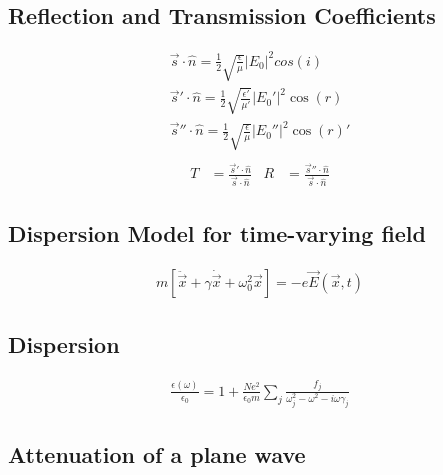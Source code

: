 \documentclass[a4paper, 11pt, landscape]{article}
\begin{document}
\begin{multicols*}{3}
\subsection{Reflection and Transmission Coefficients}
\begin{compactenum}
	\begin{align*}
        \vec{s} \cdot \hat{n} = \frac{1}{2}\sqrt{\frac{\epsilon}{\mu}}|E_{0}|^{2}cos(i) \\
        \vec{s}' \cdot \hat{n} = \frac{1}{2}\sqrt{\frac{\epsilon'}{\mu'}}|E_{0}'|^{2}\cos(r) \\
        \vec{s}'' \cdot \hat{n} = \frac{1}{2}\sqrt{\frac{\epsilon}{\mu}}|E_{0}''|^{2}\cos(r)' \\
	\end{align*}
	\begin{align*}
	    T &= \frac{\vec{s}' \cdot \hat{n}}{\vec{s} \cdot \hat{n}} & R &= \frac{\vec{s}'' \cdot \hat{n}}{\vec{s} \cdot \hat{n}}
    \end{align*}
\end{compactenum}

\subsection{Dispersion Model for time-varying field}
\begin{compactenum}
	\begin{align*}
        m[\ddot{\vec{x}} + \gamma\dot{\vec{x}} + \omega_{0}^{2}\vec{x}] = -e\vec{E}(\vec{x}, t)
	\end{align*}
\end{compactenum}

\subsection{Dispersion}
\begin{compactenum}
	\begin{align*}
        \frac{\epsilon(\omega)}{\epsilon_{0}} = 1 + \frac{Ne^{2}}{\epsilon_{0}m}\sum_{j}\frac{f_{j}}{\omega^{2}_{j} - \omega^{2} - i\omega\gamma_{j}}
	\end{align*}
\end{compactenum}

\subsection{Attenuation of a plane wave}
\begin{compactenum}

\end{compactenum}




\raggedcolumns
\end{multicols*}
\end{document}
